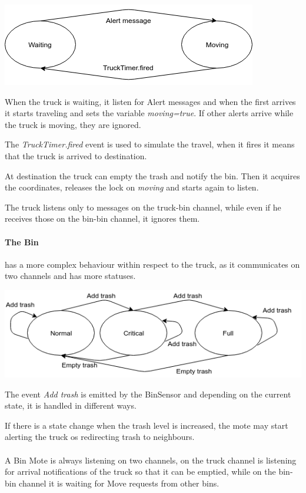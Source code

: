 \documentclass[a4paper,12pt,notitlepage]{report}
\begin{document}
\begin{center}
    \includegraphics[scale=0.9]{truck.png}
\end{center}

When the truck is waiting, it listen for Alert messages and when the first arrives it starts traveling and sets the variable \emph{moving=true}. 
If other alerts arrive while the truck is moving, they are ignored.

The \emph{TruckTimer.fired} event is used to simulate the travel, when it fires it means that the truck is arrived to destination.

At destination the truck can empty the trash and notify the bin. Then it acquires the coordinates, releases the lock on \emph{moving} and starts again to listen.

The truck listens only to messages on the truck-bin channel, while even if he receives those on the bin-bin channel, it ignores them.

\paragraph*{The Bin} has a more complex behaviour within respect to the truck, as it communicates on two channels and has more statuses.

\begin{center}
    \includegraphics[scale=0.75]{bin.png}
\end{center}

The event \emph{Add trash} is emitted by the BinSensor and depending on the current state, it is handled in different ways.

If there is a state change when the trash level is increased, the mote may start alerting the truck os redirecting trash to neighbours.
\\\\
A Bin Mote is always listening on two channels, on the truck channel is listening for arrival notifications of the truck so that it can be emptied,
while on the bin-bin channel it is waiting for Move requests from other bins.
\end{document}
